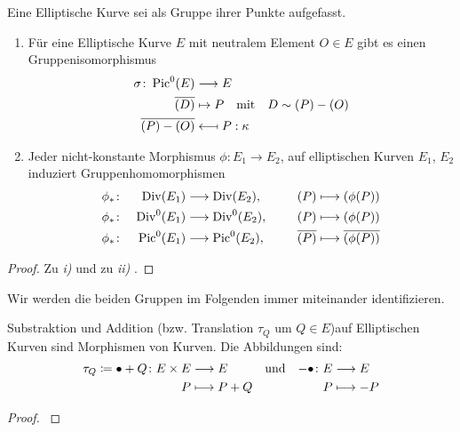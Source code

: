 \begin{Satz}\label{gruppenaequivalenz}
  Eine Elliptische Kurve sei als Gruppe ihrer Punkte aufgefasst.
  \begin{enumerate}[label=\roman*)]
  \item 
    Für eine Elliptische Kurve $E$ mit neutralem Element $O\in E$ gibt
    es einen Gruppenisomorphismus
    \begin{align*}
      \sigma\colon \operatorname{Pic}^0(E) &\longrightarrow E\\
      \overline{(D)} &\mapsto P
                       \quad\text{mit}\quad D\sim (P)-(O)\\
      \overline{(P)-(O)} &\longmapsfrom P : \kappa
    \end{align*}

  \item
    Jeder nicht-konstante Morphismus $\phi\colon E_1\to E_2$, 
    auf elliptischen Kurven $E_1$, $E_2$ induziert Gruppenhomomorphismen
    \begin{alignat*}{3}
      &\phi_*\colon& \operatorname{Div}(E_1) 
      &\longrightarrow \operatorname{Div}(E_2),
      \qquad
      &(P) &\longmapsto (\phi(P))\\
      &\phi_*\colon& \operatorname{Div}^0(E_1) 
      &\longrightarrow \operatorname{Div}^0(E_2),
      &(P) &\longmapsto (\phi(P))\\
      &\phi_*\colon& \operatorname{Pic}^0(E_1) 
      &\longrightarrow \operatorname{Pic}^0(E_2),
      &\overline{(P)} &\longmapsto \overline{(\phi(P))}\\
    \end{alignat*}
  \end{enumerate}
  \begin{proof}
    Zu \emph{i)} \cite[siehe][Proposition III.3.4]{silverman} und
    zu \emph{ii)} \cite[siehe][Remark II.3.7]{silverman}.
    \end{proof}
  \end{Satz}
  Wir werden die beiden Gruppen im Folgenden immer miteinander
  identifizieren.


  \begin{Satz}\label{additionmorphismus}
    Substraktion und Addition (bzw. Translation $\tau_Q$ um $Q\in E$)auf
    Elliptischen Kurven sind Morphismen von Kurven. Die Abbildungen sind:
    \begin{align*}
      \tau_Q\coloneqq\bullet+Q\colon E\times E&\longrightarrow E  
      &&\text{und}  
      &-\bullet\colon E&\longrightarrow E \\
      P&\longmapsto P+Q             
      &&&P&\longmapsto -P
    \end{align*}
    \begin{proof}
      \cite[siehe][Theorem III.3.6]{silverman}
    \end{proof}
  \end{Satz}


